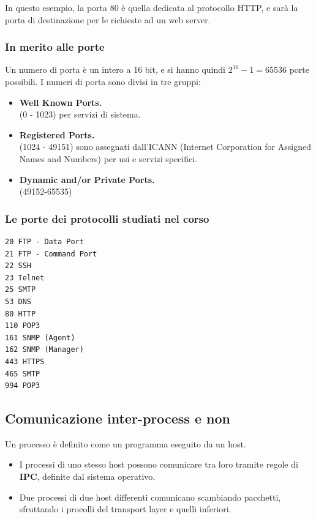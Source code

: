 In questo esempio, la porta 80 è quella dedicata al protocollo HTTP, e sarà la porta di destinazione per le richieste ad un web server.

\subsubsection{In merito alle porte}
Un numero di porta è un intero a 16 bit, e si hanno quindi $2^{16}-1 = 65536$ porte possibili. I numeri di porta sono divisi in tre gruppi:
\begin{itemize}
    \item \textbf{Well Known Ports.}\\
    (0 - 1023) per servizi di sistema.
    \item \textbf{Registered Ports.}\\
    (1024 - 49151) sono assegnati dall'ICANN (Internet Corporation for Assigned Names and Numbers) per usi e servizi specifici.
    \item \textbf{Dynamic and/or Private Ports.}\\
    (49152-65535)
\end{itemize}

\subsubsection{Le porte dei protocolli studiati nel corso}
\begin{verbatim}
20 FTP - Data Port
21 FTP - Command Port
22 SSH 
23 Telnet
25 SMTP
53 DNS
80 HTTP
110 POP3
161 SNMP (Agent)
162 SNMP (Manager)
443 HTTPS
465 SMTP
994 POP3
\end{verbatim}

\subsection{Comunicazione inter-process e non}
Un processo è definito come un programma eseguito da un host.
\begin{itemize}
    \item I processi di uno stesso host possono comunicare tra loro tramite regole di \textbf{IPC}, definite dal sistema operativo.
    \item Due processi di due host differenti comunicano scambiando pacchetti, sfruttando i procolli del transport layer e quelli inferiori.
\end{itemize}

\newpage

